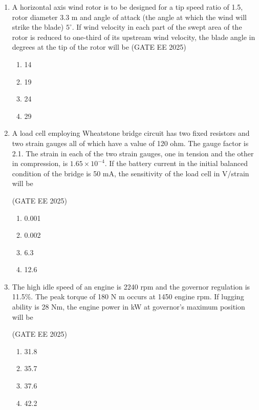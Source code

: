\documentclass[journal,12pt,onecolumn]{IEEEtran}
\theoremstyle{remark}
\begin{document}
\begin{enumerate}
    \item A horizontal axis wind rotor is to be designed for a tip speed ratio of 1.5, 
    rotor diameter 3.3 m and angle of attack (the angle at which the wind will strike the blade) $5^\circ$. 
    If wind velocity in each part of the swept area of the rotor is reduced to one-third of its upstream wind velocity, 
    the blade angle in degrees at the tip of the rotor will be
    \hfill(GATE EE 2025)
    
    \begin{multicols}{4}
    \begin{enumerate}
        \item 14
        \item 19
        \item 24
        \item 29
    \end{enumerate}
    \end{multicols}

    \item A load cell employing Wheatstone bridge circuit has two fixed resistors and two strain gauges all of which have a value of 120 ohm. 
    The gauge factor is 2.1. The strain in each of the two strain gauges, one in tension and the other in compression, 
    is $1.65 \times 10^{-4}$. If the battery current in the initial balanced condition of the bridge is 50 mA, 
    the sensitivity of the load cell in V/strain will be
    
    \hfill(GATE EE 2025)
    \begin{multicols}{4}
    \begin{enumerate}
        \item 0.001
        \item 0.002
        \item 6.3
        \item 12.6
    \end{enumerate}
    \end{multicols}

    \item The high idle speed of an engine is 2240 rpm and the governor regulation is 11.5\%. 
    The peak torque of 180 N m occurs at 1450 engine rpm. If lugging ability is 28 Nm, 
    the engine power in kW at governor's maximum position will be

    \hfill(GATE EE 2025)
    
    \begin{multicols}{4}
    \begin{enumerate}
        \item 31.8
        \item 35.7
        \item 37.6
        \item 42.2
    \end{enumerate}
    \end{multicols}


\end{enumerate}
\end{document}
